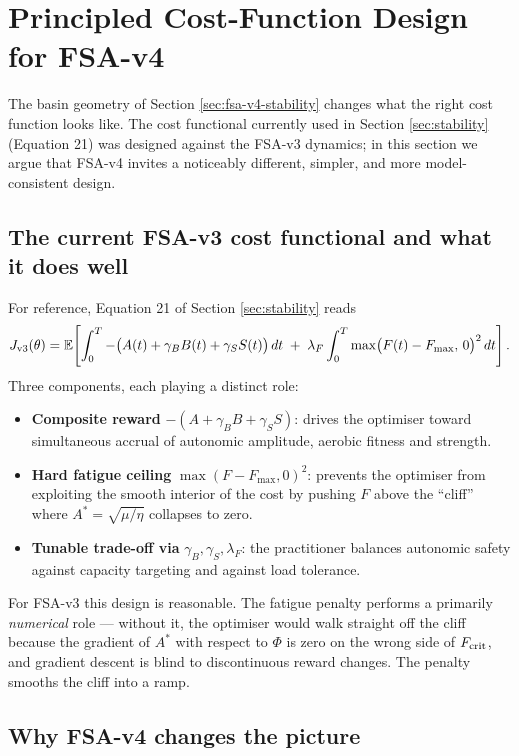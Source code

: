 \section{Principled Cost-Function Design for FSA-v4} \label{sec:fsa-v4-cost}

The basin geometry of Section \ref{sec:fsa-v4-stability} changes what the right cost function looks like. The cost functional currently used in Section \ref{sec:stability} (Equation 21) was designed against the FSA-v3 dynamics; in this section we argue that FSA-v4 invites a noticeably different, simpler, and more model-consistent design.

\subsection{The current FSA-v3 cost functional and what it does well}

For reference, Equation 21 of Section \ref{sec:stability} reads
\begin{equation}
J_{\rm v3}(\theta) = \mathbb{E}\!\left[\int_0^T -\big(A(t) + \gamma_B B(t) + \gamma_S S(t)\big)\, dt \;+\; \lambda_F \int_0^T \max\!\big(F(t) - F_{\max},\, 0\big)^2 \, dt\right].
\label{eq:v3-cost}
\end{equation}
Three components, each playing a distinct role:
\begin{itemize}
  \item \textbf{Composite reward} $-(A + \gamma_B B + \gamma_S S)$: drives the optimiser toward simultaneous accrual of autonomic amplitude, aerobic fitness and strength.
  \item \textbf{Hard fatigue ceiling} $\max(F-F_{\max},0)^2$: prevents the optimiser from exploiting the smooth interior of the cost by pushing $F$ above the ``cliff'' where $A^* = \sqrt{\mu/\eta}$ collapses to zero.
  \item \textbf{Tunable trade-off via} $\gamma_B, \gamma_S, \lambda_F$: the practitioner balances autonomic safety against capacity targeting and against load tolerance.
\end{itemize}
For FSA-v3 this design is reasonable. The fatigue penalty performs a primarily \emph{numerical} role — without it, the optimiser would walk straight off the cliff because the gradient of $A^*$ with respect to $\Phi$ is zero on the wrong side of $F_{\rm crit}$, and gradient descent is blind to discontinuous reward changes. The penalty smooths the cliff into a ramp.

\subsection{Why FSA-v4 changes the picture}

